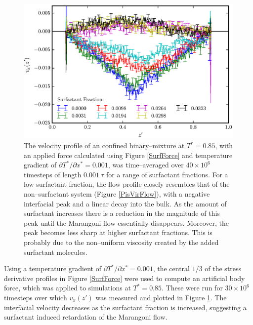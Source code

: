 \begin{figure}[h!]
\centering
\includegraphics[scale=1.0]{SurfFlow}
\caption{The velocity profile of an confined binary--mixture at $T^{*}=0.85$, with an applied force calculated using Figure \ref{SurfForce} and temperature gradient of $\partial T^{*} / \partial x^{*} = 0.001$, was time--averaged over $40 \times 10^{6}$ timesteps of length $0.001\ \tau$ for a range of surfactant fractions.
For a low surfactant fraction, the flow profile closely resembles that of the non--surfactant system (Figure \ref{PisVirFlow}), with a negative interfacial peak and a linear decay into the bulk.
As the amount of surfactant increases there is a reduction in the magnitude of this peak until the Marangoni flow essentially disappears.
Moreover, the peak becomes less sharp at higher surfactant fractions.
This is probably due to the non--uniform viscosity created by the added surfactant molecules.
}
\label{SurfFlow}
\end{figure}
Using a temperature gradient of $\partial T^{*} / \partial x^{*} = 0.001$, the central $1/3$ of the stress derivative profiles in Figure \ref{SurfForce} were used to compute an artificial body force, which was applied to simulations at $T^{*}=0.85$.
These were run for $30 \times 10^{6}$ timesteps over which $v_{x}(z')$ was measured and plotted in Figure \ref{SurfFlow}.
The interfacial velocity decreases as the surfactant fraction is increased, suggesting a surfactant induced retardation of the Marangoni flow.

